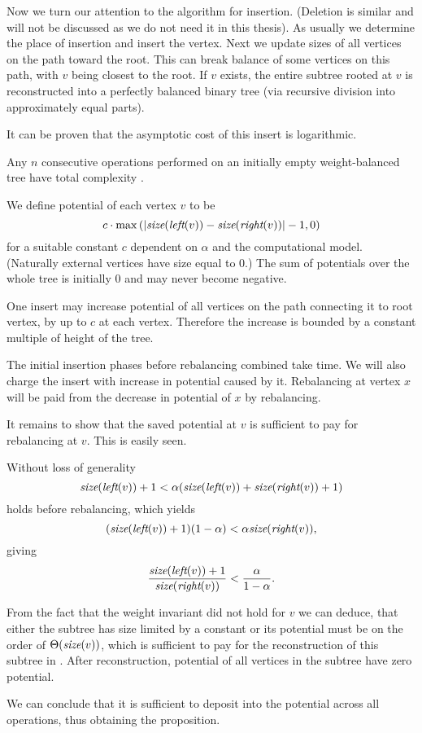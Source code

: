 Now we turn our attention to the algorithm for insertion. (Deletion is similar and will not be discussed as we do not need it in this thesis). As usually we determine the place of insertion and insert the vertex. Next we update sizes of all vertices on the path toward the root. This can break balance of some vertices on this path, with $v$ being closest to the root. If $v$ exists, the entire subtree rooted at $v$ is reconstructed into a perfectly balanced binary tree (via recursive division into approximately equal parts).

It can be proven that the asymptotic cost of this insert is logarithmic.

\begin{prop}
Any $n$ consecutive operations performed on an initially empty weight-balanced tree have total complexity . 
\end{prop}

\begin{myproof}
We define potential of each vertex $v$ to be $$c \cdot \max\left(|\text{\it size}(\text{\it left}(v)) - \text{\it size}(\text{\it right}(v))| - 1, 0\right)$$ for a suitable constant $c$ dependent on $\alpha$ and the computational model. (Naturally external vertices have size equal to 0.) The sum of potentials over the whole tree is initially 0 and may never become negative.

One insert may increase potential of all vertices on the path connecting it to root vertex, by up to $c$ at each vertex. Therefore the increase is bounded by a constant multiple of height of the tree.

The initial insertion phases before rebalancing combined take  time. We will also charge the insert with increase in potential caused by it. Rebalancing at vertex $x$ will be paid from the decrease in potential of $x$ by rebalancing. 

It remains to show that the saved potential at $v$ is sufficient to pay for rebalancing at $v$. This is easily seen. 

Without loss of generality
$$ \text{\it size}(\text{\it left}(v)) + 1 < \alpha ( \text{\it size}(\text{\it left}(v)) + \text{\it size}(\text{\it right}(v)) + 1 ) $$
holds before rebalancing, which yields
$$ (\text{\it size}(\text{\it left}(v)) + 1)(1 - \alpha) < \alpha \text{\it size}(\text{\it right}(v)), $$
giving
$$ { \text{\it size}(\text{\it left}(v)) + 1 \over \text{\it size}(\text{\it right}(v)) } < { \alpha \over 1 - \alpha }. $$

From the fact that the weight invariant did not hold for $v$ we can deduce, that either the subtree has size limited by a constant or its potential must be on the order of $\Theta(\text{\it size}(v))$, which is sufficient to pay for the reconstruction of this subtree in . After reconstruction, potential of all vertices in the subtree have zero potential.

We can conclude that it is sufficient to deposit  into the potential across all operations, thus obtaining the proposition.
\end{myproof}